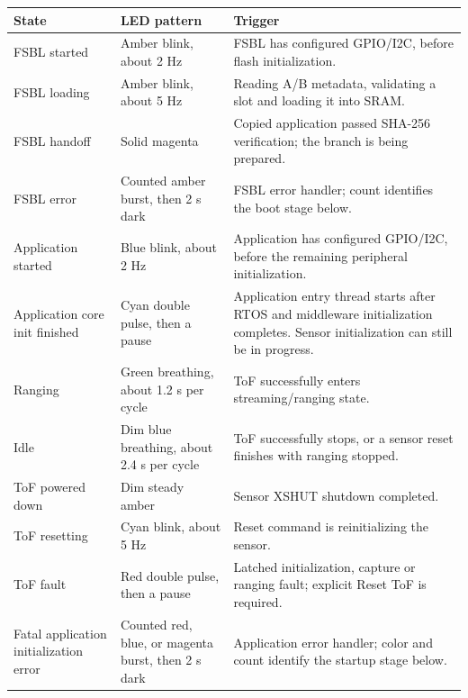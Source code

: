 \documentclass[10pt,a4paper,oneside]{report}
\begin{document}
{\def\LTcaptype{none} %
\begin{longtable}[]{@{}
  >{\raggedright\arraybackslash}p{}
  >{\raggedright\arraybackslash}p{}
  >{\raggedright\arraybackslash}p{}@{}}
\toprule\noalign{}
\begin{minipage}[b]{\linewidth}\raggedright
\textbf{State}
\end{minipage} & \begin{minipage}[b]{\linewidth}\raggedright
\textbf{LED pattern}
\end{minipage} & \begin{minipage}[b]{\linewidth}\raggedright
\textbf{Trigger}
\end{minipage} \\
\midrule\noalign{}
\endhead
\bottomrule\noalign{}
\endlastfoot
FSBL started & Amber blink, about 2 Hz & FSBL has configured GPIO/I2C, before flash initialization. \\
FSBL loading & Amber blink, about 5 Hz & Reading A/B metadata, validating a slot and loading it into SRAM. \\
FSBL handoff & Solid magenta & Copied application passed SHA-256 verification; the branch is being prepared. \\
FSBL error & Counted amber burst, then 2 s dark & FSBL error handler; count identifies the boot stage below. \\
Application started & Blue blink, about 2 Hz & Application has configured GPIO/I2C, before the remaining peripheral initialization. \\
Application core init finished & Cyan double pulse, then a pause & Application entry thread starts after RTOS and middleware initialization completes. Sensor initialization can still be in progress. \\
Ranging & Green breathing, about 1.2 s per cycle & ToF successfully enters streaming/ranging state. \\
Idle & Dim blue breathing, about 2.4 s per cycle & ToF successfully stops, or a sensor reset finishes with ranging stopped. \\
ToF powered down & Dim steady amber & Sensor XSHUT shutdown completed. \\
ToF resetting & Cyan blink, about 5 Hz & Reset command is reinitializing the sensor. \\
ToF fault & Red double pulse, then a pause & Latched initialization, capture or ranging fault; explicit Reset ToF is required. \\
Fatal application initialization error & Counted red, blue, or magenta burst, then 2 s dark & Application error handler; color and count identify the startup stage below. \\
\end{longtable}
}
\end{document}
